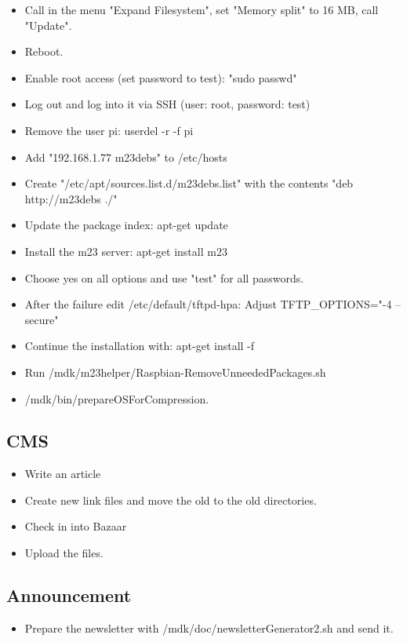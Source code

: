 \begin{itemize}
\begin{itemize}
		\item Call in the menu "Expand Filesystem", set "Memory split" to 16 MB, call "Update".
		\item Reboot.
		\item Enable root access (set password to test): "sudo passwd"
		\item Log out and log into it via SSH (user: root, password: test)
		\item Remove the user pi: userdel -r -f pi
		\item Add "192.168.1.77 m23debs" to /etc/hosts
		\item Create "/etc/apt/sources.list.d/m23debs.list" with the contents "deb http://m23debs ./"
		\item Update the package index: apt-get update
		\item Install the m23 server: apt-get install m23
		\item Choose yes on all options and use "test" for all passwords.
		\item After the failure edit /etc/default/tftpd-hpa: Adjust TFTP_OPTIONS="-4 --secure"
		\item Continue the installation with: apt-get install -f
		\item Run /mdk/m23helper/Raspbian-RemoveUnneededPackages.sh
		\item /mdk/bin/prepareOSForCompression.
	\end{itemize}
\end{itemize}


\subsection{CMS}
\begin{itemize}
	\item Write an article
	\item Create new link files and move the old to the old directories.
	\item Check in into Bazaar
	\item Upload the files.
\end{itemize}


\subsection{Announcement}
\begin{itemize}
	\item Prepare the newsletter with /mdk/doc/newsletterGenerator2.sh and send it.
\end{itemize}